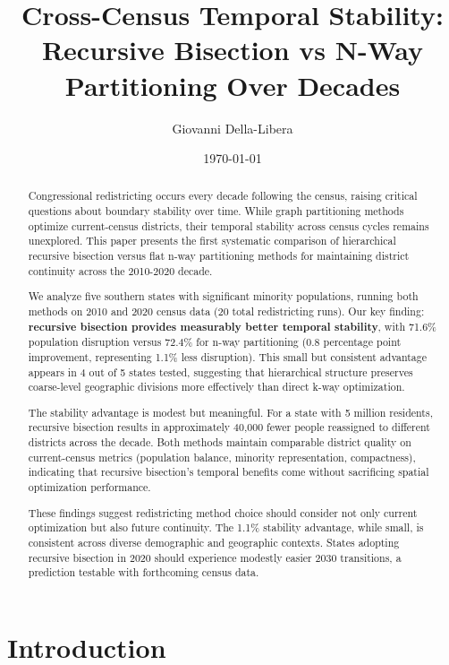 \documentclass[12pt]{article}
\title{Cross-Census Temporal Stability:\\
Recursive Bisection vs N-Way Partitioning Over Decades}
\author{Giovanni Della-Libera}
\date{\today}
\begin{document}
\maketitle

\begin{abstract}
Congressional redistricting occurs every decade following the census, raising critical questions about boundary stability over time. While graph partitioning methods optimize current-census districts, their temporal stability across census cycles remains unexplored. This paper presents the first systematic comparison of hierarchical recursive bisection versus flat n-way partitioning methods for maintaining district continuity across the 2010-2020 decade.

We analyze five southern states with significant minority populations, running both methods on 2010 and 2020 census data (20 total redistricting runs). Our key finding: \textbf{recursive bisection provides measurably better temporal stability}, with 71.6\% population disruption versus 72.4\% for n-way partitioning (0.8 percentage point improvement, representing 1.1\% less disruption). This small but consistent advantage appears in 4 out of 5 states tested, suggesting that hierarchical structure preserves coarse-level geographic divisions more effectively than direct k-way optimization.

The stability advantage is modest but meaningful. For a state with 5 million residents, recursive bisection results in approximately 40,000 fewer people reassigned to different districts across the decade. Both methods maintain comparable district quality on current-census metrics (population balance, minority representation, compactness), indicating that recursive bisection's temporal benefits come without sacrificing spatial optimization performance.

These findings suggest redistricting method choice should consider not only current optimization but also future continuity. The 1.1\% stability advantage, while small, is consistent across diverse demographic and geographic contexts. States adopting recursive bisection in 2020 should experience modestly easier 2030 transitions, a prediction testable with forthcoming census data.
\end{abstract}

\section{Introduction}

\end{document}
